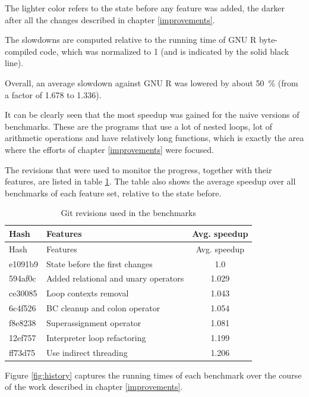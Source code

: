 The lighter color refers to the state before any feature was added, the darker after all the changes described in chapter \ref{improvements}.

The slowdowns are computed relative to the running time of GNU R byte-compiled code, which was normalized to 1 (and is indicated by the solid black line).

Overall, an average slowdown against GNU R was lowered by about 50~\% (from a factor of 1.678 to 1.336).

It can be clearly seen that the most speedup was gained for the naive versions of benchmarks. These are the programs that use a lot of nested loops, lot of arithmetic operations and have relatively long functions, which is exactly the area where the efforts of chapter \ref{improvements} were focused.

The revisions that were used to monitor the progress, together with their features, are listed in table \ref{tab:git-rev}. The table also shows the average speedup over all benchmarks of each feature set, relative to the state before.

\begin{longtable}[c]{@{}llc@{}}
\caption{Git revisions used in the benchmarks\label{tab:git-rev}} \tabularnewline
\toprule
Hash & Features & Avg. speedup \tabularnewline
\midrule
\endfirsthead
\toprule
Hash & Features & Avg. speedup \tabularnewline
\midrule
\endhead
e1091b9 & State before the first changes & 1.0 \tabularnewline
594af0c & Added relational and unary operators & 1.029 \tabularnewline
ce30085 & Loop contexts removal & 1.043 \tabularnewline
6c4f526 & BC cleanup and colon operator & 1.054 \tabularnewline
f8e8238 & Superassignment operator & 1.081 \tabularnewline
12ef757 & Interpreter loop refactoring & 1.199 \tabularnewline
ff73d75 & Use indirect threading & 1.206 \tabularnewline
\bottomrule
\end{longtable}

Figure \ref{fig:history} captures the running times of each benchmark over the course of the work described in chapter \ref{improvements}.

